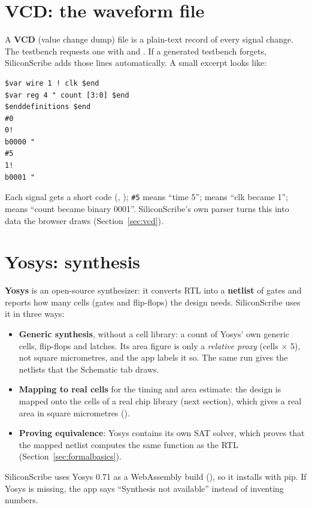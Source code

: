 \section{VCD: the waveform file}
\label{sec:vcdbasics}

A \textbf{VCD} (value change dump) file is a plain-text record of every signal change. The testbench requests one with  and . If a generated testbench forgets, SiliconScribe adds those lines automatically. A small excerpt looks like:

\begin{lstlisting}[style=plain]
$var wire 1 ! clk $end
$var reg 4 " count [3:0] $end
$enddefinitions $end
#0
0!
b0000 "
#5
1!
b0001 "
\end{lstlisting}

Each signal gets a short code (\code{!}, ); \texttt{\#5} means ``time 5'';  means ``clk became 1'';  means ``count became binary 0001''. SiliconScribe's own parser turns this into data the browser draws (Section~\ref{sec:vcd}).

\section{Yosys: synthesis}

\textbf{Yosys} is an open-source synthesizer: it converts RTL into a \textbf{netlist} of gates and reports how many cells (gates and flip-flops) the design needs. SiliconScribe uses it in three ways:
\begin{itemize}
  \item \textbf{Generic synthesis}, without a cell library: a count of Yosys' own generic cells, flip-flops and latches. Its area figure is only a \emph{relative proxy} (cells $\times$ 5), not square micrometres, and the app labels it so. The same run gives the netlists that the Schematic tab draws.
  \item \textbf{Mapping to real cells} for the timing and area estimate: the design is mapped onto the cells of a real chip library (next section), which gives a real area in square micrometres (\umsq{}).
  \item \textbf{Proving equivalence}: Yosys contains its own SAT solver, which proves that the mapped netlist computes the same function as the RTL (Section~\ref{sec:formalbasics}).
\end{itemize}
SiliconScribe uses Yosys 0.71 as a WebAssembly build (), so it installs with pip. If Yosys is missing, the app says ``Synthesis not available'' instead of inventing numbers.

